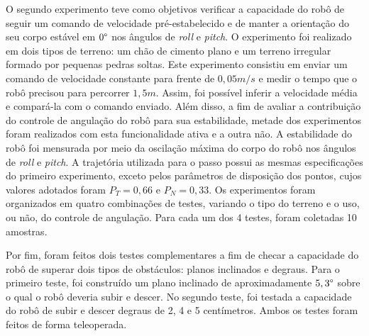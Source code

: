 \documentclass[../main.tex]{subfiles}
\begin{document}
  O segundo experimento teve como objetivos verificar a capacidade do robô de seguir um comando de velocidade pré-estabelecido e de manter a orientação do seu corpo estável em $0\degree$ nos ângulos de \textit{roll} e \textit{pitch}. O experimento foi realizado em dois tipos de terreno: um chão de cimento plano e um terreno irregular formado por pequenas pedras soltas. Este experimento consistiu em enviar um comando de velocidade constante para frente de $0,05 m/s$ e medir o tempo que o robô precisou para percorrer $1,5 m$. Assim, foi possível inferir a velocidade média e compará-la com o comando enviado. Além disso, a fim de avaliar a contribuição do controle de angulação do robô para sua estabilidade, metade dos experimentos foram realizados com esta funcionalidade ativa e a outra não. A estabilidade do robô foi mensurada por meio da oscilação máxima do corpo do robô nos ângulos de \textit{roll} e \textit{pitch}. A trajetória utilizada para o passo possui as mesmas especificações do primeiro experimento, exceto pelos parâmetros de disposição dos pontos, cujos valores adotados foram $P_T = 0,66$ e $P_N = 0,33$. Os experimentos foram organizados em quatro combinações de testes, variando o tipo do terreno e o uso, ou não, do controle de angulação. Para cada um dos 4 testes, foram coletadas 10 amostras.
  
  Por fim, foram feitos dois testes complementares a fim de checar a capacidade do robô de superar dois tipos de obstáculos: planos inclinados e degraus. Para o primeiro teste, foi construído um plano inclinado de aproximadamente $5,3\degree$ sobre o qual o robô deveria subir e descer. No segundo teste, foi testada a capacidade do robô de subir e descer degraus de 2, 4 e 5 centímetros. Ambos os testes foram feitos de forma teleoperada.
\end{document}
